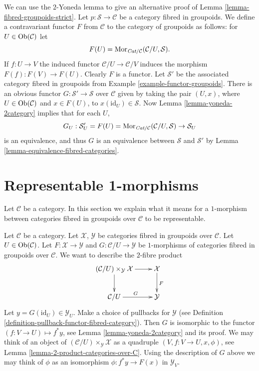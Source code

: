 \begin{remark}
\label{remark-alternative-fibred-groupoids-strict}
We can use the $2$-Yoneda lemma to give an alternative proof of
Lemma \ref{lemma-fibred-groupoids-strict}.
Let $p : \mathcal{S} \to \mathcal{C}$ be a category fibred in groupoids.
We define a contravariant functor $F$ from $\mathcal{C}$ to the
category of groupoids as follows: for $U\in \mathop{\mathrm{Ob}}\nolimits(\mathcal{C})$
let
$$
F(U) = \mathop{\mathrm{Mor}}\nolimits_{\textit{Cat}/\mathcal{C}}(\mathcal{C}/U, \mathcal{S}).
$$
If $f : U \to V$ the induced functor $\mathcal{C}/U \to \mathcal{C}/V$
induces the morphism $F(f) : F(V) \to F(U)$. Clearly $F$ is a functor.
Let $\mathcal{S}'$ be the associated category fibred in groupoids from
Example \ref{example-functor-groupoids}.
There is an obvious functor $G : \mathcal{S}' \to \mathcal{S}$
over $\mathcal{C}$ given by taking the pair $(U, x)$, where
$U \in \mathop{\mathrm{Ob}}\nolimits(\mathcal{C})$ and $x \in F(U)$, to
$x(\text{id}_U) \in \mathcal{S}$. Now
Lemma \ref{lemma-yoneda-2category}
implies that for each $U$,
$$
G_U : \mathcal{S}'_U = F(U)=
\mathop{\mathrm{Mor}}\nolimits_{\textit{Cat}/\mathcal{C}}(\mathcal{C}/U, \mathcal{S})
\to
\mathcal{S}_U
$$
is an equivalence, and thus $G$ is an equivalence between $\mathcal{S}$ and
$\mathcal{S}'$ by Lemma \ref{lemma-equivalence-fibred-categories}.
\end{remark}





\section{Representable 1-morphisms}
\label{section-representable-1-morphisms}

\noindent
Let $\mathcal{C}$ be a category.
In this section we explain what it means for a $1$-morphism
between categories fibred in groupoids over $\mathcal{C}$
to be representable.

\medskip\noindent
Let $\mathcal{C}$ be a category.
Let $\mathcal{X}$, $\mathcal{Y}$ be categories fibred in groupoids
over $\mathcal{C}$.
Let $U \in \mathop{\mathrm{Ob}}\nolimits(\mathcal{C})$.
Let $F : \mathcal{X} \to \mathcal{Y}$ and
$G : \mathcal{C}/U \to \mathcal{Y}$ be $1$-morphisms of categories
fibred in groupoids over $\mathcal{C}$.
We want to describe
the $2$-fibre product
$$
\xymatrix{
(\mathcal{C}/U) \times_\mathcal{Y} \mathcal{X} \ar[r] \ar[d] &
\mathcal{X} \ar[d]^F \\
\mathcal{C}/U \ar[r]^G &
\mathcal{Y}
}
$$
Let $y = G(\text{id}_U) \in \mathcal{Y}_U$.
Make a choice of pullbacks for $\mathcal{Y}$
(see Definition \ref{definition-pullback-functor-fibred-category}).
Then $G$ is isomorphic to the functor $(f : V \to U) \mapsto f^*y$,
see Lemma \ref{lemma-yoneda-2category} and its proof.
We may think of an object of
$(\mathcal{C}/U) \times_\mathcal{Y} \mathcal{X}$
as a quadruple $(V, f : V \to U, x, \phi)$, see
Lemma \ref{lemma-2-product-categories-over-C}.
Using the description of $G$ above we may think of $\phi$ as
an isomorphism $\phi : f^*y \to F(x)$ in $\mathcal{Y}_V$.

